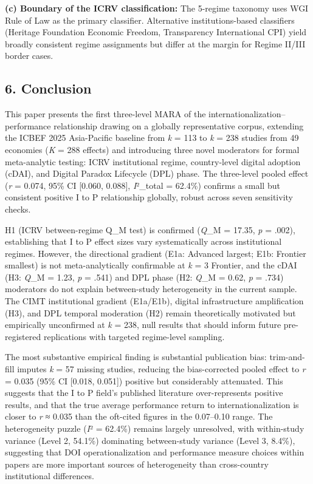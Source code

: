 \documentclass[
  12pt,a4paper]{article}
\begin{document}
\textbf{(c) Boundary of the ICRV classification:} The 5-regime taxonomy
uses WGI Rule of Law as the primary classifier. Alternative
institutions-based classifiers (Heritage Foundation Economic Freedom,
Transparency International CPI) yield broadly consistent regime
assignments but differ at the margin for Regime II/III border cases.

\hypertarget{conclusion}{%
\subsection{6. Conclusion}\label{conclusion}}

This paper presents the first three-level MARA of the
internationalization--performance relationship drawing on a globally
representative corpus, extending the ICBEF 2025 Asia-Pacific baseline
from \emph{k} = 113 to \emph{k} = 238 studies from 49 economies
(\emph{K} = 288 effects) and introducing three novel moderators for
formal meta-analytic testing: ICRV institutional regime, country-level
digital adoption (cDAI), and Digital Paradox Lifecycle (DPL) phase. The
three-level pooled effect (\emph{r} = 0.074, 95\% CI {[}0.060, 0.088{]},
\emph{I}²\_total = 62.4\%) confirms a small but consistent positive I to
P relationship globally, robust across seven sensitivity checks.

H1 (ICRV between-regime Q\_M test) is confirmed (\emph{Q}\_M = 17.35,
\emph{p} = .002), establishing that I to P effect sizes vary
systematically across institutional regimes. However, the directional
gradient (E1a: Advanced largest; E1b: Frontier smallest) is not
meta-analytically confirmable at \emph{k} = 3 Frontier, and the cDAI
(H3: \emph{Q}\_M = 1.23, \emph{p} = .541) and DPL phase (H2: \emph{Q}\_M
= 0.62, \emph{p} = .734) moderators do not explain between-study
heterogeneity in the current sample. The CIMT institutional gradient
(E1a/E1b), digital infrastructure amplification (H3), and DPL temporal
moderation (H2) remain theoretically motivated but empirically
unconfirmed at \emph{k} = 238, null results that should inform future
pre-registered replications with targeted regime-level sampling.

The most substantive empirical finding is substantial publication bias:
trim-and-fill imputes \emph{k} = 57 missing studies, reducing the
bias-corrected pooled effect to \emph{r} = 0.035 (95\% CI {[}0.018,
0.051{]}) positive but considerably attenuated. This suggests that the I
to P field's published literature over-represents positive results, and
that the true average performance return to internationalization is
closer to \emph{r} ≈ 0.035 than the oft-cited figures in the 0.07--0.10
range. The heterogeneity puzzle (\emph{I}² = 62.4\%) remains largely
unresolved, with within-study variance (Level 2, 54.1\%) dominating
between-study variance (Level 3, 8.4\%), suggesting that DOI
operationalization and performance measure choices within papers are
more important sources of heterogeneity than cross-country institutional
differences.
\end{document}
